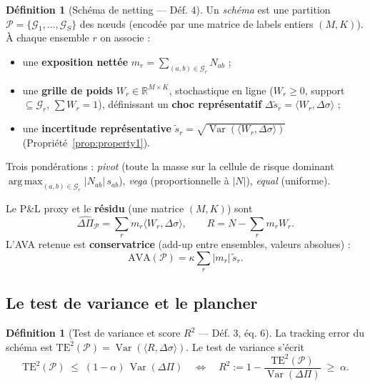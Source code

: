 \documentclass[11pt,a4paper]{article}
\DeclareMathOperator{\Var}{Var}
\DeclareMathOperator*{\argmax}{arg\,max}
\newcommand{\R}{\mathbb{R}}
\newcommand{\dsig}{\Delta\sigma}
\newcommand{\dPi}{\Delta\Pi}
\newcommand{\st}{\tilde{s}}
\newcommand{\abs}[1]{\left| #1 \right|}
\theoremstyle{plain}
\theoremstyle{definition}
\newtheorem{definition}[theoreme]{Définition}
\theoremstyle{remark}
\begin{document}
\begin{definition}[Schéma de netting --- Déf. 4]\label{def:netting}
Un \emph{schéma} est une partition $\mathcal P = \{\mathcal G_1,\dots,\mathcal G_S\}$
des nœuds (encodée par une matrice de labels entiers $(M,K)$). À chaque ensemble $r$
on associe :
\begin{itemize}[nosep]
\item une \textbf{exposition nettée} $m_r = \sum_{(a,b)\in\mathcal G_r} N_{ab}$ ;
\item une \textbf{grille de poids} $W_r\in\R^{M\times K}$, stochastique en ligne
      ($W_r\ge 0$, support $\subseteq\mathcal G_r$, $\sum W_r = 1$), définissant un
      \textbf{choc représentatif} $\Delta\st_r = \langle W_r, \dsig\rangle$ ;
\item une \textbf{incertitude représentative} $\st_r = \sqrt{\Var(\langle W_r,
      \dsig\rangle)}$ (Propriété~\ref{prop:property1}).
\end{itemize}
Trois pondérations : \emph{pivot} (toute la masse sur la cellule de risque dominant
$\argmax_{(a,b)\in\mathcal G_r}\abs{N_{ab}}\,s_{ab}$), \emph{vega} (proportionnelle à
$\abs{N}$), \emph{equal} (uniforme).
\end{definition}

Le P\&L proxy et le \textbf{résidu} (une matrice $(M,K)$) sont
\begin{equation}
\widehat{\dPi}_{\mathcal P} = \sum_r m_r \langle W_r,\dsig\rangle,
\qquad
R = N - \sum_r m_r W_r .
\label{eq:proxy}
\end{equation}
L'AVA retenue est \textbf{conservatrice} (add-up entre ensembles, valeurs absolues) :
\begin{equation}
\mathrm{AVA}(\mathcal P) = \kappa \sum_r \abs{m_r}\, \st_r .
\label{eq:ava-scheme}
\end{equation}

\subsection{Le test de variance et le plancher}

\begin{definition}[Test de variance et score $R^2$ --- Déf. 3, éq. 6]
La tracking error du schéma est $\mathrm{TE}^2(\mathcal P) = \Var(\langle R,
\dsig\rangle)$. Le test de variance s'écrit
\begin{equation}
\mathrm{TE}^2(\mathcal P) \;\le\; (1-\alpha)\,\Var(\dPi)
\quad\Longleftrightarrow\quad
R^2 := 1 - \frac{\mathrm{TE}^2(\mathcal P)}{\Var(\dPi)} \;\ge\; \alpha .
\label{eq:test}
\end{equation}
\end{definition}
\end{document}
